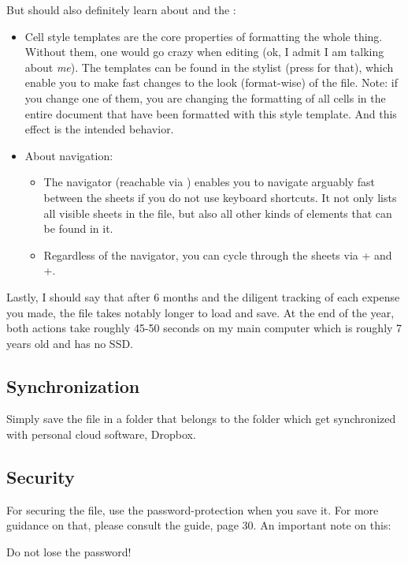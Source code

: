But should also definitely learn about  and the :
\begin{itemize}
	\item Cell style templates are the core properties of formatting the whole thing.
	Without them, one would go crazy when editing \tfn (ok, I admit I am talking about \emph{me}).
	The templates can be found in the stylist (press  for that), which enable you to make fast changes to the look (format-wise) of the file.
	Note: if you change one of them, you are changing the formatting of all cells in the entire document that have been formatted with this style template.
	And this effect is the intended behavior.
	\item About navigation:
	\begin{itemize}
		\item The navigator (reachable via ) enables you to navigate arguably fast between the sheets if you do not use keyboard shortcuts.
		It not only lists all visible sheets in the file, but also all other kinds of elements that can be found in it.
		\item Regardless of the navigator, you can cycle through the sheets via + and +.
	\end{itemize}
\end{itemize}

Lastly, I should say that after 6 months and the diligent tracking of each expense you made, the file takes notably longer to load and save.
At the end of the year, both actions take roughly 45-50 seconds on my main computer which is roughly 7 years old and has no SSD.

\subsection{Synchronization}
\label{subsec:synchronization}

Simply save the file in a folder that belongs to the folder which get synchronized with personal cloud software, \eg Dropbox.

\subsection{Security}
\label{subsec:security}

For securing the file, use the password-protection when you save it.
For more guidance on that, please consult the  guide, page 30.
An important note on this:
\begin{specialnote}
Do not lose the password!
\end{specialnote}

